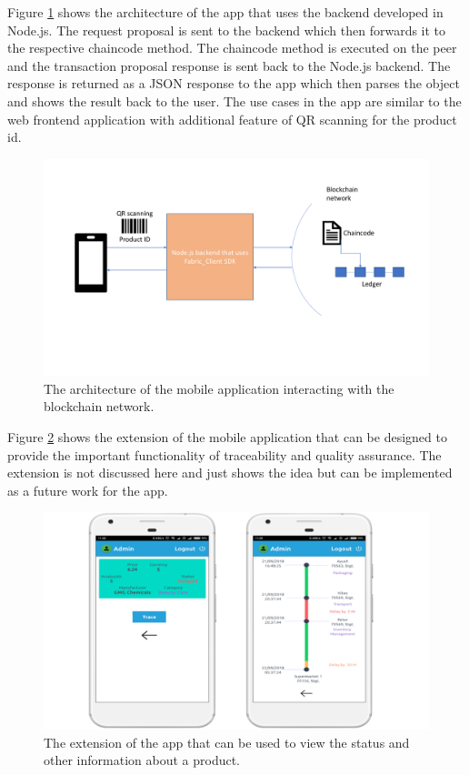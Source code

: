 \documentclass[
  a4paper,  %
  twoside,  %
  bibliography=totoc,
  headsepline,
  cleardoublepage=empty,
  parskip=half,
  draft=false
]{scrbook}
\begin{document}
Figure \ref{fig:arch2} shows the architecture of the app that uses the backend developed in Node.js. The request proposal is sent to the backend which then forwards it to the respective chaincode method. The chaincode method is executed on the peer and the transaction proposal response is sent back to the Node.js backend. The response is returned as a JSON response to the app which then parses the object and shows the result back to the user. The use cases in the app are similar to the web frontend application with additional feature of QR scanning for the product id.
\begin{figure}[h!]
\begin{center}
\includegraphics[width=\textwidth]{graphics/arch2.pdf}
\caption{The architecture of the mobile application interacting with the blockchain network.}
\label{fig:arch2}
\end{center}
\end{figure}

Figure \ref{fig:app2} shows the extension of the mobile application that can be designed to provide the important functionality of traceability and quality assurance. The extension is not discussed here and just shows the idea but can be implemented as a future work for the app.
\begin{figure}[h!]
\begin{center}
\includegraphics[width=\textwidth]{graphics/app2.pdf}
\caption{The extension of the app that can be used to view the status and other information about a product.}
\label{fig:app2}
\end{center}
\end{figure}
\end{document}

